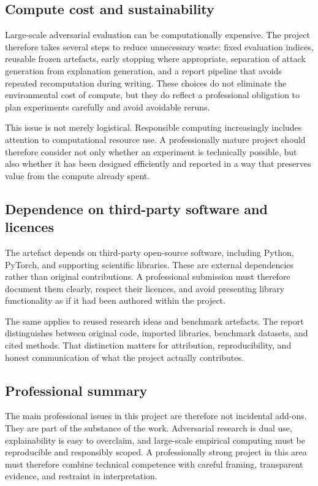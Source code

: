 \subsection{Compute cost and sustainability}
Large-scale adversarial evaluation can be computationally expensive.
The project therefore takes several steps to reduce unnecessary waste: fixed evaluation indices, reusable frozen artefacts, early stopping where appropriate, separation of attack generation from explanation generation, and a report pipeline that avoids repeated recomputation during writing.
These choices do not eliminate the environmental cost of compute, but they do reflect a professional obligation to plan experiments carefully and avoid avoidable reruns.

This issue is not merely logistical.
Responsible computing increasingly includes attention to computational resource use.
A professionally mature project should therefore consider not only whether an experiment is technically possible, but also whether it has been designed efficiently and reported in a way that preserves value from the compute already spent.

\subsection{Dependence on third-party software and licences}
The artefact depends on third-party open-source software, including Python, PyTorch, and supporting scientific libraries.
These are external dependencies rather than original contributions.
A professional submission must therefore document them clearly, respect their licences, and avoid presenting library functionality as if it had been authored within the project.

The same applies to reused research ideas and benchmark artefacts.
The report distinguishes between original code, imported libraries, benchmark datasets, and cited methods.
That distinction matters for attribution, reproducibility, and honest communication of what the project actually contributes.

\subsection{Professional summary}
The main professional issues in this project are therefore not incidental add-ons.
They are part of the substance of the work.
Adversarial research is dual use, explainability is easy to overclaim, and large-scale empirical computing must be reproducible and responsibly scoped.
A professionally strong project in this area must therefore combine technical competence with careful framing, transparent evidence, and restraint in interpretation.
